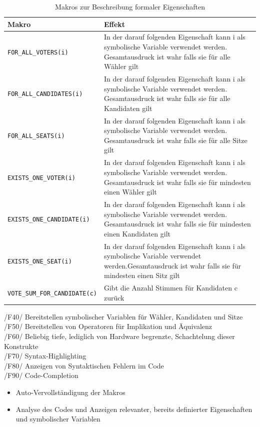 \documentclass[a4paper]{scrreprt}
\begin{document}
\begin{table}
\caption{Makros zur Beschreibung formaler Eigenschaften}
\begin{tabular}{|p{5cm}|p{10cm}|}
Makro & Effekt \\
\hline 
\verb!FOR_ALL_VOTERS(i)! & In der darauf folgenden Eigenschaft kann i als symbolische Variable verwendet werden. Gesamtausdruck ist wahr falls sie für alle Wähler gilt \\
\verb!FOR_ALL_CANDIDATES(i)! & In der darauf folgenden Eigenschaft kann i als symbolische Variable verwendet werden. Gesamtausdruck ist wahr falls sie für alle Kandidaten gilt \\
\verb!FOR_ALL_SEATS(i)! & In der darauf folgenden Eigenschaft kann i als symbolische Variable verwendet werden. Gesamtausdruck ist wahr falls sie für alle Sitze gilt \\
\verb!EXISTS_ONE_VOTER(i)! & In der darauf folgenden Eigenschaft kann i als symbolische Variable verwendet werden. Gesamtausdruck ist wahr falls sie für mindesten einen Wähler gilt \\
\verb!EXISTS_ONE_CANDIDATE(i)! & In der darauf folgenden Eigenschaft kann i als symbolische Variable verwendet werden. Gesamtausdruck ist wahr falls sie für mindesten einen Kandidaten gilt \\
\verb!EXISTS_ONE_SEAT(i)! & In der darauf folgenden Eigenschaft kann i als symbolische Variable verwendet werden.Gesamtausdruck ist wahr falls sie für mindesten einen Sitz gilt \\
\verb!VOTE_SUM_FOR_CANDIDATE(c)! & Gibt die Anzahl Stimmen für Kandidaten c zurück\\
\end{tabular}
\label{table:Macros_for_formal_Attributes}
\end{table}
/F40/ Bereitstellen symbolischer Variablen für Wähler, Kandidaten und Sitze \\
/F50/ Bereitstellen von Operatoren für Implikation und Äquivalenz \\
/F60/ Beliebig tiefe, lediglich von Hardware begrenzte, Schachtelung dieser Konstrukte \\
/F70/ Syntax-Highlighting \\
/F80/ Anzeigen von Syntaktischen Fehlern im Code \\
/F90/ Code-Completion
\begin{itemize}
\item Auto-Vervollständigung der Makros
\item Analyse des Codes und Anzeigen relevanter, bereits definierter Eigenschaften und symbolischer Variablen
\end{itemize}
\end{document}
